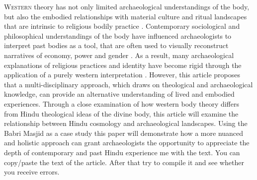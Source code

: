 \lettrine[lines=3,slope=-4pt,nindent=-4pt]{W}{estern} theory has not only limited archaeological understandings of the body, but also the embodied relationships with material culture and ritual landscapes that are intrinsic to religious bodily practice \parencite{Hamilakis_2002, Insoll_2004}. Contemporary sociological and philosophical understandings of the body \parencites{Bourdieu_1977}{Foucault_1977} have influenced archaeologists to interpret past bodies as a tool, that are often used to visually reconstruct narratives of economy, power and gender \parencites{Barrett_1994}{Shanks_1987}. As a result, many archaeological explanations of religious practices and identity have become rigid through the application of a purely western interpretation \parencites{Edwards_2005}{Insoll_2004} . However, this article proposes that a multi-disciplinary approach, which draws on theological and archaeological knowledge, can provide an alternative understanding of lived and embodied experiences. Through a close examination of how western body theory differs from Hindu theological ideas of the divine body, this article will examine the relationship between Hindu cosmology and archaeological landscapes. Using the Babri Masjid as a case study this paper will demonstrate how a more nuanced and holistic approach can grant archaeologists the opportunity to appreciate the depth of contemporary and past Hindu experience  me with the text. You can copy/paste the text of the article. After that try to compile it and see whether you receive errors.
	

